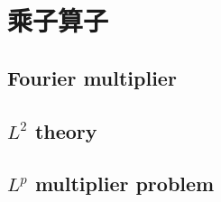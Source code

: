 \section{乘子算子}
\label{b2:sec:2201}


\subsection{Fourier multiplier}
\label{b2:subsec:220101}

\subsection{\texorpdfstring{\(L^2\)}{L2} theory}
\label{b2:subsec:220102}

\subsection{\texorpdfstring{\(L^p\)}{Lp} multiplier problem}
\label{b2:subsec:220103}


